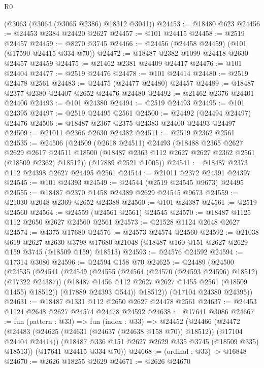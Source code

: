 \begin{lexlean}{R0}
\begin{coremodule}
    (@3063 (@3064 (@3065 @2386) @18312 @3041))
@24453 := @18480 @623
@24456 := @24453 @2384 @24420 @2627
@24457 := @101 @24415
@24458 := @2519 @24457
@24459 := @8270 @3745
@24466 := @24456 (@24458 @24459) (@101 (@17590 @24415 @334 @70))
@24472 := @18487 @2382 @1099 @24418 @2630 @24457 @24459
@24475 := @21462 @2381 @24409 @24417
@24476 := @101 @24404
@24477 := @2519 @24476
@24478 := @101 @24414
@24480 := @2519 @24478 @2561
@24483 := @24475 (@24477 @24480) @24457
@24489 := @18487 @2377 @2380 @24407 @2652 @24476 @24480
@24492 := @21462 @2376 @24401 @24406
@24493 := @101 @24380
@24494 := @2519 @24493
@24495 := @101 @24395
@24497 := @2519 @24495 @2561
@24500 := @24492 (@24494 @24497) @24476
@24506 := @18487 @2367 @2375 @24383 @24400 @24493 @24497
@24509 := @21011 @2366 @2630 @24382
@24511 := @2519 @2362 @2561
@24535 := @24506
    (@24509
      (@2618 @24511)
      @24493
      (@18488
        @2365
        @2627
        @2629
        @2617
        @24511
        @18500
        (@18487 @2363 @112 @2627 @2627 @2362 @2561 (@18509 @2362) @18512))
      (@17889 @2521 @1005))
@24541 := @18487 @2373 @112 @24398 @2627 @24495 @2561
@24544 := @21011 @2372 @24391 @24397
@24545 := @101 @24393
@24549 := @24544 (@2519 @24545 @9673) @24495
@24555 := @18487 @2370 @1458 @24389 @2629 @24545 @9673
@24559 := @21030 @2048 @2369 @2652 @24388
@24560 := @101 @24387
@24561 := @2519 @24560
@24564 := @24559 (@24561 @2561) @24545
@24570 := @18487 @1125 @112 @2650 @2627 @24560 @2561
@24573 := @21528 @1124 @2648 @2627
@24574 := @4375 @17680
@24576 := @24573 @24574 @24560
@24592 := @21038
    @619
    @2627
    @2630
    @3798
    @17680
    @21048
    (@18487 @160 @151 @2627 @2629 @159 @3745 (@18509 @159) @18513)
@24593 := @24576 @24592
@24594 := @17314 @3086
@24596 := @24594 @158 @70
@24625 := @24489
    (@24500
      (@24535
        (@24541
          (@24549
            (@24555
              (@24564 (@24570 (@24593 @24596) @18512) (@17322 @24387))
              (@18487 @1456 @112 @2627 @2627 @1455 @2561 (@18509 @1455) @18512))
            (@17889 @24393 @544))
          @18512))
      (@17104 @24380 @24395))
@24631 := @18487 @1331 @112 @2650 @2627 @24478 @2561
@24637 := @24453 @1124 @2648 @2627 @24574 @24478 @24592
@24638 := @17641 @3086
@24667 := fun (pattern : @33) =>
  fun (index : @33) =>
  @24452
    (@24466
      (@24472
        (@24483 (@24625 (@24631 (@24637 (@24638 @158 @70)) @18512)) (@17104 @24404 @24414))
        (@18487 @336 @151 @2627 @2629 @335 @3745 (@18509 @335) @18513))
      (@17641 @24415 @334 @70))
@24668 := (ordinal : @33) -> @16848
@24670 := @2626 @18255 @2629
@24671 := @2626 @24670

\end{coremodule}
\end{lexlean}
